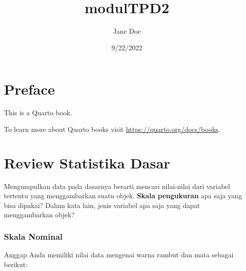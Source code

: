 \documentclass[
  letterpaper,
  DIV=11,
  numbers=noendperiod]{scrreprt}
\title{modulTPD2}
\author{Jane Doe}
\date{9/22/2022}
\renewcommand*\contentsname{Table of contents}
\newcommand\contentsname{Table of contents}
\begin{document}
\maketitle
\ifdefined\Shaded\renewenvironment{Shaded}{\begin{tcolorbox}[enhanced, sharp corners, breakable, interior hidden, borderline west={3pt}{0pt}{shadecolor}, frame hidden, boxrule=0pt]}{\end{tcolorbox}}\fi

\renewcommand*\contentsname{Table of contents}
{
\hypersetup{linkcolor=}
\setcounter{tocdepth}{2}
\tableofcontents
}

\hypertarget{preface}{%
\chapter*{Preface}\label{preface}}

This is a Quarto book.

To learn more about Quarto books visit
\url{https://quarto.org/docs/books}.


\hypertarget{review-statistika-dasar}{%
\chapter{Review Statistika Dasar}\label{review-statistika-dasar}}

Mengumpulkan data pada dasarnya berarti mencari nilai-nilai dari
variabel tertentu yang menggambarkan suatu objek. \textbf{Skala
pengukuran} apa saja yang bisa dipakai? Dalam kata lain, jenis variabel
apa saja yang dapat menggambarkan objek?

\hypertarget{skala-nominal}{%
\subsection{Skala Nominal}\label{skala-nominal}}

Anggap Anda memiliki nilai data mengenai warna rambut dan mata sebagai
berikut:
\end{document}
